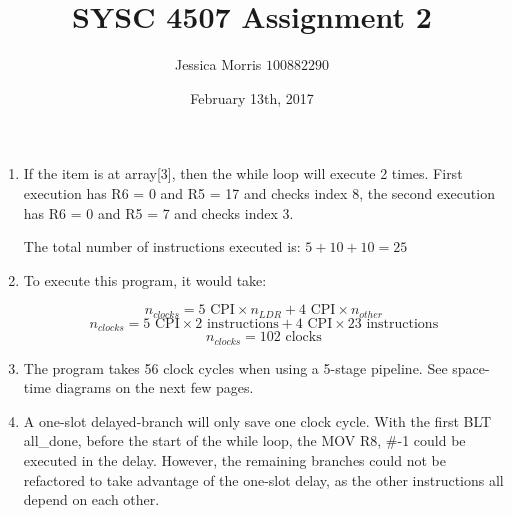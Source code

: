 \documentclass{article}
\title{SYSC 4507 Assignment 2}
\date{February 13th, 2017}
\author{Jessica Morris \(100882290\)}
\begin{document}
\maketitle

\begin{enumerate}

\item If the item is at array[3], then the while loop will execute 2 times. First execution has R6 = 0 and R5 = 17 and checks index 8, the second execution has R6 = 0 and R5 = 7 and checks index 3.

The total number of instructions executed is: $ 5 + 10 + 10 = 25 $

\item To execute this program, it would take:

$$ n_{clocks} = 5 \text{ CPI} \times n_{LDR} + 4 \text{ CPI} \times n_{other} $$
$$ n_{clocks} = 5 \text{ CPI} \times 2 \text{ instructions} + 4 \text{ CPI} \times 23 \text{ instructions} $$
$$ n_{clocks} = 102 \text{ clocks} $$

\item The program takes 56 clock cycles when using a 5-stage pipeline. See space-time diagrams on the next few pages.

\item A one-slot delayed-branch will only save one clock cycle. With the first BLT all\_done, before the start of the while loop, the MOV R8, \#-1 could be executed in the delay. However, the remaining branches could not be refactored to take advantage of the one-slot delay, as the other instructions all depend on each other.

\end{enumerate}
\end{document}
